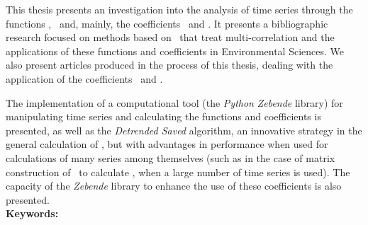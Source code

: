 \begin{thesisabastract}

This thesis presents an investigation into the analysis of time series through the functions \dfa, \dcca~and, mainly, the coefficients \pdcca~and \dmc. It presents a bibliographic research focused on methods based on \dfa~that treat multi-correlation and the applications of these functions and coefficients in Environmental Sciences. We also present articles produced in the process of this thesis, dealing with the application of the coefficients \pdcca~and \dmc.

The implementation of a computational tool (the \emph{Python} \emph{Zebende} library) for manipulating time series and calculating the functions and coefficients is presented, as well as the \emph{Detrended Saved} algorithm, an innovative strategy in the general calculation of \dcca, but with advantages in performance when used for calculations of many series among themselves (such as in the case of matrix construction of \pdcca~to calculate \dmc, when a large number of time series is used). The capacity of the \emph{Zebende} library to enhance the use of these coefficients is also presented.
\\

\textbf{Keywords:} \ppgmkeywords

\end{thesisabastract}
